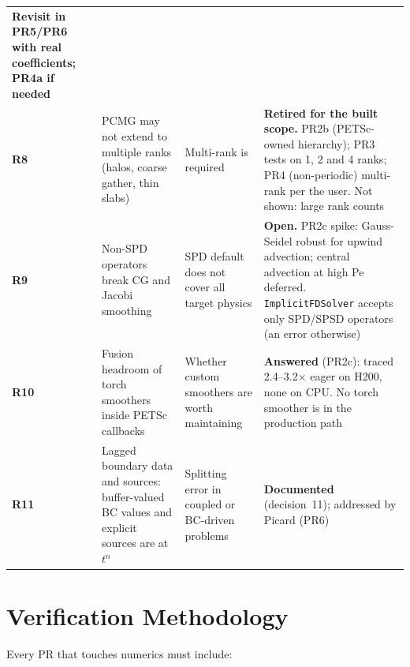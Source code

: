 \documentclass[11pt]{article}
\begin{document}
\begin{longtable}{>{\bfseries}p{} p{} p{} p{}}
Revisit in PR5/PR6 with real coefficients; PR4a if needed \\
R8 & PCMG may not extend to multiple ranks (halos, coarse gather, thin
slabs) & Multi-rank is required & \textbf{Retired for the built scope.}
PR2b (PETSc-owned hierarchy); PR3 tests on 1, 2 and 4 ranks; PR4
(non-periodic) multi-rank per the user. Not shown: large rank counts \\
R9 & Non-SPD operators break CG and Jacobi smoothing & SPD default does not
cover all target physics & \textbf{Open.} PR2c spike: Gauss-Seidel robust
for upwind advection; central advection at high Pe deferred.
\texttt{ImplicitFDSolver} accepts only SPD/SPSD operators (an error
otherwise) \\
R10 & Fusion headroom of torch smoothers inside PETSc callbacks & Whether
custom smoothers are worth maintaining & \textbf{Answered} (PR2c): traced
2.4--3.2$\times$ eager on H200, none on CPU. No torch smoother is in the
production path \\
R11 & Lagged boundary data and sources: buffer-valued BC values and explicit
sources are at $t^n$ & Splitting error in coupled or BC-driven problems &
\textbf{Documented} (decision~11); addressed by Picard (PR6) \\
\bottomrule
\end{longtable}

\section{Verification Methodology}
\label{sec:verification}

Every PR that touches numerics must include:
\end{document}
